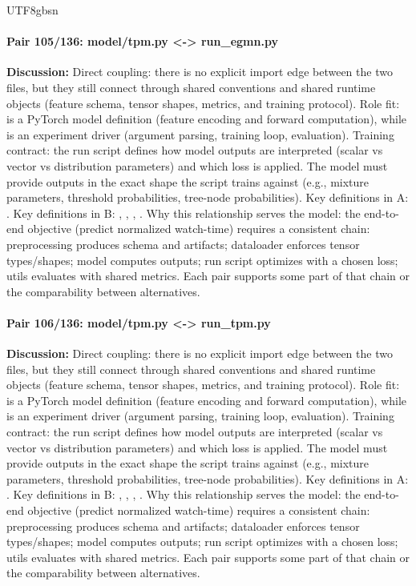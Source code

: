 \documentclass[11pt]{article}
\begin{document}
\begin{CJK*}{UTF8}{gbsn}
\paragraph{Pair 105/136: model/tpm.py <-> run\_egmn.py}
\textbf{Discussion:} Direct coupling: there is no explicit import edge between the two files, but they still connect through shared conventions and shared runtime objects (feature schema, tensor shapes, metrics, and training protocol). Role fit: \texttt{} is a PyTorch model definition (feature encoding and forward computation), while \texttt{} is an experiment driver (argument parsing, training loop, evaluation). Training contract: the run script defines how model outputs are interpreted (scalar vs vector vs distribution parameters) and which loss is applied. The model must provide outputs in the exact shape the script trains against (e.g., mixture parameters, threshold probabilities, tree-node probabilities). Key definitions in A: \texttt{}. Key definitions in B: \texttt{}, \texttt{}, \texttt{}, \texttt{}. Why this relationship serves the model: the end-to-end objective (predict normalized watch-time) requires a consistent chain: preprocessing produces schema and artifacts; dataloader enforces tensor types/shapes; model computes outputs; run script optimizes with a chosen loss; utils evaluates with shared metrics. Each pair supports some part of that chain or the comparability between alternatives.

\paragraph{Pair 106/136: model/tpm.py <-> run\_tpm.py}
\textbf{Discussion:} Direct coupling: there is no explicit import edge between the two files, but they still connect through shared conventions and shared runtime objects (feature schema, tensor shapes, metrics, and training protocol). Role fit: \texttt{} is a PyTorch model definition (feature encoding and forward computation), while \texttt{} is an experiment driver (argument parsing, training loop, evaluation). Training contract: the run script defines how model outputs are interpreted (scalar vs vector vs distribution parameters) and which loss is applied. The model must provide outputs in the exact shape the script trains against (e.g., mixture parameters, threshold probabilities, tree-node probabilities). Key definitions in A: \texttt{}. Key definitions in B: \texttt{}, \texttt{}, \texttt{}, \texttt{}. Why this relationship serves the model: the end-to-end objective (predict normalized watch-time) requires a consistent chain: preprocessing produces schema and artifacts; dataloader enforces tensor types/shapes; model computes outputs; run script optimizes with a chosen loss; utils evaluates with shared metrics. Each pair supports some part of that chain or the comparability between alternatives.


\end{CJK*}
\end{document}
